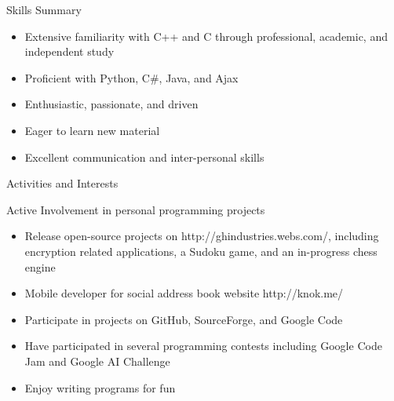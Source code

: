 \documentclass[11pt]{article}
\begin{document}
	\begin{section}{Skills Summary}

		\begin{itemize}
			\item Extensive familiarity with C++ and C through professional, academic, and independent study
			\item Proficient with Python, C\#, Java, and Ajax
			\item Enthusiastic, passionate, and driven
			\item Eager to learn new material
            \item Excellent communication and inter-personal skills
		\end{itemize}

	\end{section}

	\begin{section}{Activities and Interests}

		\begin{bf}Active Involvement in personal programming projects\end{bf}

		\begin{itemize}
			\item Release open-source projects on http://ghindustries.webs.com/, including encryption related applications, a Sudoku game, and an in-progress chess engine
            \item Mobile developer for social address book website http://knok.me/
            \item Participate in projects on GitHub, SourceForge, and Google Code
            \item Have participated in several programming contests including Google Code Jam and Google AI Challenge
			\item Enjoy writing programs for fun
		\end{itemize}

	\end{section}
\end{document}

